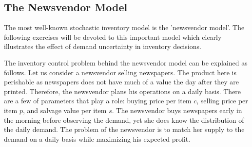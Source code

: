 %
%
%
%
%
%
%

\subsection{The Newsvendor Model}



The most well-known stochastic inventory model is the 'newsvendor model'. The following exercises will be devoted to this important model which clearly illustrates the effect of demand uncertainty in inventory decisions. 

The inventory control problem behind the newsvendor model can be explained as follows. Let us consider a newsvendor selling newspapers. The product here is perishable as newspapers does not have much of a value the day after they are printed. Therefore, the newsvendor plans his operations on a daily basis. There are a few of parameters that play a role: buying price per item $c$, selling price per item $p$, and salvage value per item $s$. The newsvendor buys newspapers early in the morning before observing the demand, yet she does know the distribution of the daily demand. The problem of the newsvendor is to match her supply to the demand on a daily basis while maximizing his expected profit.

